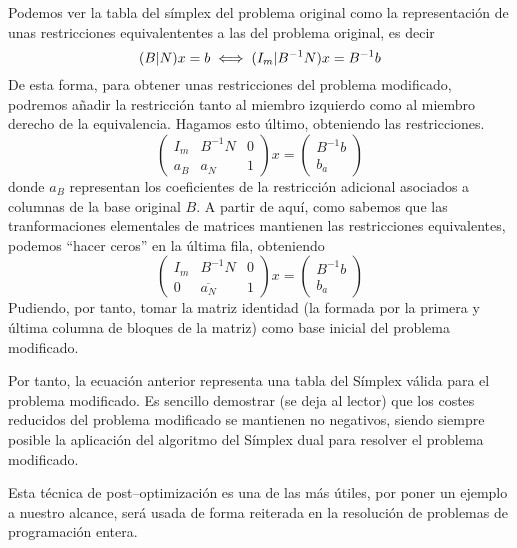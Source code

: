 Podemos ver la tabla del símplex del problema original como la representación de unas restricciones equivalententes a las del problema original, es decir
\begin{equation*}
	(B|N)x=b\iff(I_m|B^{-1}N)x=B^{-1}b
\end{equation*}
De esta forma, para obtener unas restricciones del problema modificado, podremos añadir la restricción tanto al miembro izquierdo como al miembro derecho de la equivalencia. Hagamos esto último, obteniendo las restricciones.
\begin{equation*}
	\left(\begin{array}{c|c|c}
		I_m&B^{-1}N&0\\\hline
		a_B&a_N&1
	\end{array}\right)x=\left(\begin{array}{c}
	B^{-1}b\\\hline b_a
\end{array}\right)
\end{equation*}
donde $a_B$ representan los coeficientes de la restricción adicional asociados a columnas de la base original $B$. A partir de aquí, como sabemos que las tranformaciones elementales de matrices mantienen las restricciones equivalentes, podemos ``hacer ceros'' en la última fila, obteniendo
\begin{equation*}
	\left(\begin{array}{c|c|c}
		I_m&B^{-1}N&0\\\hline
		0&\overline{a_N}&1
	\end{array}\right)x=\left(\begin{array}{c}
	B^{-1}b\\\hline b_a
\end{array}\right)
\end{equation*}
Pudiendo, por tanto, tomar la matriz identidad (la formada por la primera y última columna de bloques de la matriz) como base inicial del problema modificado.

Por tanto, la ecuación anterior representa una tabla del Símplex válida para el problema modificado. Es sencillo demostrar (se deja al lector) que los costes reducidos del problema modificado se mantienen no negativos, siendo siempre posible la aplicación del algoritmo del Símplex dual para resolver el problema modificado.
\begin{obs}[Aplicaciones]
	Esta técnica de post--optimización es una de las más útiles, por poner un ejemplo a nuestro alcance, será usada de forma reiterada en la resolución de problemas de programación entera.
\end{obs}